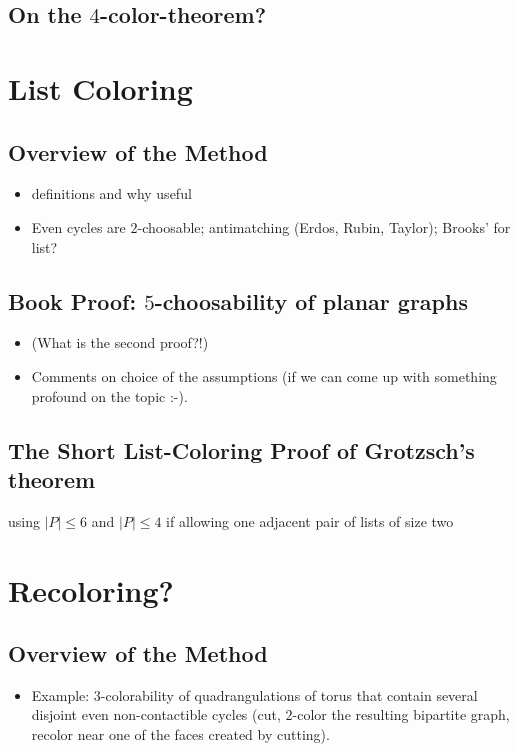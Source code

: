 \documentclass[12pt,twoside,openright,a4paper]{book}
\begin{document}
\section{On the $4$-color-theorem?}

\chapter{List Coloring}


\section{Overview of the Method}
\begin{itemize}
\item definitions and why useful
\item Even cycles are $2$-choosable; antimatching (Erdos, Rubin, Taylor); Brooks' for list?
\end{itemize}

\section{Book Proof: $5$-choosability of planar graphs}

\begin{itemize}
\item (What is the second proof?!)
\item Comments on choice of the assumptions (if we can come up with something profound on the topic :-).
\end{itemize}

\section{The Short List-Coloring Proof of Grotzsch's theorem}

using $|P|\le 6$ and $|P|\le 4$ if allowing one adjacent pair of lists of size two

\chapter{Recoloring?}


\section{Overview of the Method}

\begin{itemize}
\item Example: 3-colorability of quadrangulations of torus that contain several disjoint even non-contactible cycles
(cut, $2$-color the resulting bipartite graph, recolor near one of the faces created by cutting).
\end{itemize}
\end{document}
